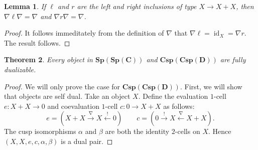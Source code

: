\documentclass[11pt]{amsart}
\newcommand{\from}{\colon}
\newcommand{\xto}[1]{\xrightarrow{#1}}
\newcommand{\bispsp}[1]{\mathbf{Sp(Sp(#1))}}
\newcommand{\bicspcsp}[1]{\mathbf{Csp(Csp(#1))}}
\DeclareMathOperator{\id}{id}
\newtheorem{thm}{Theorem}[section]
\newtheorem{lem}[thm]{Lemma}
\theoremstyle{remark}
\theoremstyle{definition}
\begin{document}
\begin{lem}
	If $\ell$ and $r$ are the left and right inclusions of type $X \to X+X$, then $\nabla \ell \nabla = \nabla$ and $\nabla r \nabla = \nabla$.
\end{lem}

\begin{proof}
	It follows immeditately from the definition of $\nabla$ that $\nabla \ell = \id_X = \nabla r$.  The result follows.  
\end{proof}

\begin{thm}
	\label{thm:SpansSpansAreFullyDualBicat}
	Every object in $\bispsp{C}$ and $\bicspcsp{D}$ are fully dualizable.
\end{thm}

\begin{proof}
	We will only prove the case for $\bicspcsp{D}$.  First, we will show that objects are self dual.  Take an object $X$. Define the evaluation $1$-cell $e \from X+X \to 0$ and coevaluation $1$-cell $c \from 0 \to X+X$ as follows:
	\[
		e = (X+X \xto{\nabla} X \xleftarrow{!} 0)
		\quad \quad
		c = (0 \xto{!} X \xleftarrow{\nabla} X+X ).
	\]
	The cusp isomorphisms $\alpha$ and $\beta$ are both the identity $2$-cells on $X$. Hence $(X,X,e,c,\alpha,\beta)$ is a dual pair.
	

\end{proof}
\end{document}
